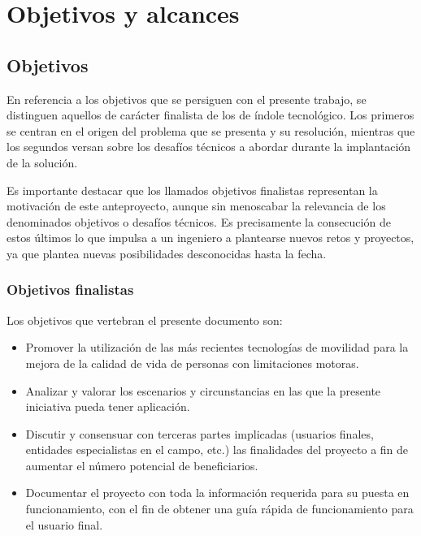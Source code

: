 \chapter{Objetivos y alcances}
\label{chap:objetivos&Alcances}
\onehalfspacing

\section{Objetivos}
\label{sec:objetivos_deObjetivos&Alcances}
En referencia a los objetivos que se persiguen con el presente trabajo, se distinguen aquellos de carácter finalista de los de índole tecnológico. Los primeros se centran en el origen del problema que se presenta y su resolución, mientras que los segundos versan sobre los desafíos técnicos a abordar durante la implantación de la solución.

Es importante destacar que los llamados objetivos finalistas representan la motivación de este anteproyecto, aunque sin menoscabar la relevancia de los denominados objetivos o desafíos técnicos. Es precisamente la consecución de estos últimos lo que impulsa a un ingeniero a plantearse nuevos retos y proyectos, ya que plantea nuevas posibilidades desconocidas hasta la fecha. 

\subsection{Objetivos finalistas}
\label{subSec:objetivosFinalistas_deObjetivos&Alcances}
Los objetivos que vertebran el presente documento son: 
\begin{itemize}
	\item Promover la utilización de las más recientes tecnologías de movilidad para la mejora de la calidad de vida de personas con limitaciones motoras. 
	\item Analizar y valorar los escenarios y circunstancias en las que la presente iniciativa pueda tener aplicación.
	\item Discutir y consensuar con terceras partes implicadas (usuarios finales, entidades especialistas en el campo, etc.) las finalidades del proyecto a fin de aumentar el número potencial de beneficiarios.
	\item Documentar el proyecto con toda la información requerida para su puesta en funcionamiento, con el fin de obtener una guía rápida de funcionamiento para el usuario final.
\end{itemize}

